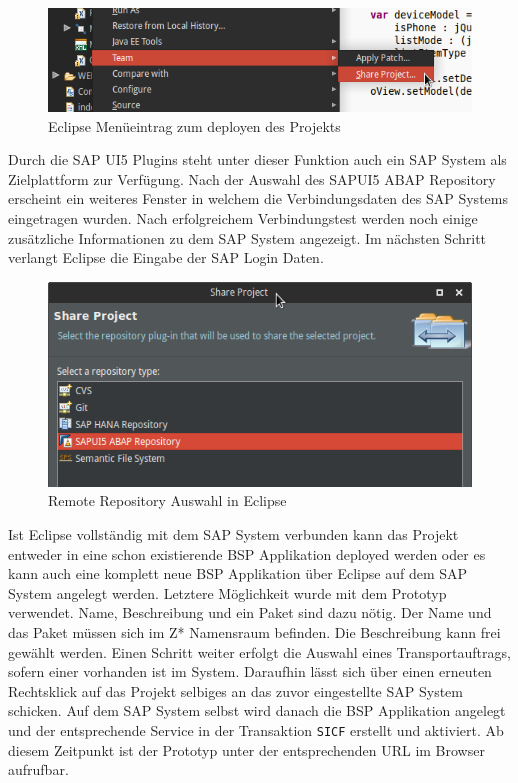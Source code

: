 \vspace{1em}
\begin{figure}[htb]
  \centering
  \includegraphics[width=0.8\linewidth]{abb/eclipse_share_project}
  \caption[Eclipse Menüeintrag zum deployen des Projekts]{Eclipse Menüeintrag zum deployen des Projekts}
  \label{fig:eclipseshare}
\end{figure}

Durch die SAP UI5 Plugins steht unter dieser Funktion auch ein SAP System als Zielplattform zur Verfügung. Nach der Auswahl des SAPUI5 ABAP Repository erscheint ein weiteres Fenster in welchem die Verbindungsdaten des SAP Systems eingetragen wurden. Nach erfolgreichem Verbindungstest werden noch einige zusätzliche Informationen zu dem SAP System angezeigt. Im nächsten Schritt verlangt Eclipse die Eingabe der SAP Login Daten.

\vspace{1em}
\begin{figure}[htb]
  \centering
  \includegraphics[width=0.8\linewidth]{abb/eclipse_share_project_window}
  \caption[Remote Repository Auswahl in Eclipse]{Remote Repository Auswahl in Eclipse}
  \label{fig:eclipsesharewindow}
\end{figure}

Ist Eclipse vollständig mit dem SAP System verbunden kann das Projekt entweder in eine schon existierende BSP Applikation deployed werden oder es kann auch eine komplett neue BSP Applikation über Eclipse auf dem SAP System angelegt werden. Letztere Möglichkeit wurde mit dem Prototyp verwendet. Name, Beschreibung und ein Paket sind dazu nötig. Der Name und das Paket müssen sich im Z* Namensraum befinden. Die Beschreibung kann frei gewählt werden. Einen Schritt weiter erfolgt die Auswahl eines Transportauftrags, sofern einer vorhanden ist im System. Daraufhin lässt sich über einen erneuten Rechtsklick auf das Projekt selbiges an das zuvor eingestellte SAP System schicken. Auf dem SAP System selbst wird danach die BSP Applikation angelegt und der entsprechende Service in der Transaktion \texttt{SICF} erstellt und aktiviert. Ab diesem Zeitpunkt ist der Prototyp unter der entsprechenden URL im Browser aufrufbar.